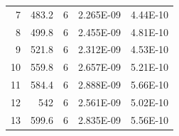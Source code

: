 \documentclass[a4paper,11pt]{article}
\begin{document}
\begin{table}[]
\begin{tabular}{rrrrr}
				\rowcolor[HTML]{C0C0C0} 
				\cellcolor[HTML]{BBDAFF}7                    & 483.2                      & 6                                                      & 2.265E-09                                                                              & 4.44E-10                                                  \\
				\rowcolor[HTML]{EFEFEF} 
				\cellcolor[HTML]{BBDAFF}8                    & 499.8                      & 6                                                      & 2.455E-09                                                                              & 4.81E-10                                                  \\
				\rowcolor[HTML]{C0C0C0} 
				\cellcolor[HTML]{BBDAFF}9                    & 521.8                      & 6                                                      & 2.312E-09                                                                              & 4.53E-10                                                  \\
				\rowcolor[HTML]{EFEFEF} 
				\cellcolor[HTML]{BBDAFF}10                   & 559.8                      & 6                                                      & 2.657E-09                                                                              & 5.21E-10                                                  \\
				\rowcolor[HTML]{C0C0C0} 
				\cellcolor[HTML]{BBDAFF}11                   & 584.4                      & 6                                                      & 2.888E-09                                                                              & 5.66E-10                                                  \\
				\rowcolor[HTML]{EFEFEF} 
				\cellcolor[HTML]{BBDAFF}12                   & 542                        & 6                                                      & 2.561E-09                                                                              & 5.02E-10                                                  \\
				\rowcolor[HTML]{C0C0C0} 
				\cellcolor[HTML]{BBDAFF}13                   & 599.6                      & 6                                                      & 2.835E-09                                                                              & 5.56E-10                                                 
			\end{tabular}
		\end{table}
		
\end{document}
